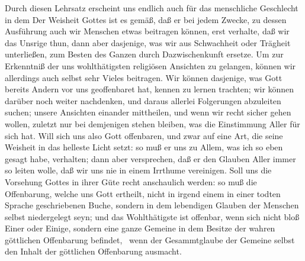 \begin{aufza}
\item Durch diesen Lehrsatz erscheint uns endlich auch  für das menschliche Geschlecht in dem  Der Weisheit Gottes ist es gemäß, daß er bei jedem Zwecke, zu dessen Ausführung auch wir Menschen etwas beitragen können, erst  verhalte, daß wir das Unsrige thun, dann aber dasjenige, was wir aus Schwachheit oder Trägheit unterließen, zum Besten des Ganzen durch  Dazwischenkunft ersetze. Um zur Erkenntniß der uns wohlthätigsten religiösen Ansichten zu gelangen, können wir allerdings auch selbst sehr Vieles beitragen. Wir können dasjenige, was Gott bereits Andern vor uns geoffenbaret hat, kennen zu lernen trachten; wir können darüber noch weiter nachdenken, und daraus allerlei Folgerungen abzuleiten suchen; unsere Ansichten einander mittheilen, und wenn wir recht sicher gehen wollen, zuletzt nur bei demjenigen stehen bleiben, was die Einstimmung Aller für sich hat. Will sich uns also Gott offenbaren, und zwar auf eine Art, die seine Weisheit in das helleste Licht setzt: so muß er uns zu Allem, was ich so eben gesagt habe, verhalten; dann aber versprechen, daß er den Glauben Aller immer so leiten wolle, daß wir uns nie in einem Irrthume vereinigen. Soll uns die Vorsehung Gottes in ihrer Güte recht anschaulich werden: so muß die Offenbarung, welche uns Gott ertheilt, nicht in irgend einem in einer todten Sprache geschriebenen Buche, sondern in dem lebendigen Glauben der Menschen selbst niedergelegt seyn; und das Wohlthätigste ist offenbar, wenn sich nicht bloß Einer oder Einige, sondern eine ganze Gemeine in dem Besitze der wahren göttlichen Offenbarung befindet, \dh\ wenn der Gesammtglaube der Gemeine selbst den Inhalt der göttlichen Offenbarung ausmacht.~
\end{aufza}

